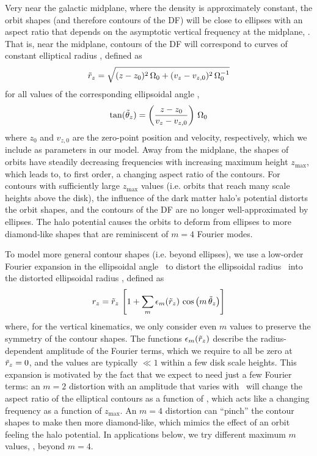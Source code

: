 Very near the galactic midplane, where the density is approximately constant, the orbit
shapes (and therefore contours of the DF) will be close to ellipses with an aspect ratio
that depends on the asymptotic vertical frequency at the midplane, \freqzero.
That is, near the midplane, contours of the DF will correspond to curves of constant
elliptical radius \rzp, defined as
\begin{equation}
    \tilde{r}_z = \sqrt{(z-z_0)^2 \, \Omega_0 + (v_z-v_{z,0})^2 \, \Omega_0^{-1}} \label{eq:rzp}
\end{equation}
for all values of the corresponding ellipsoidal angle \thzp,
\begin{equation}
    \tan (\tilde{\theta}_z) = \left(\frac{z-z_0}{v_z-v_{z,0}}\right) \, \Omega_0
    \label{eq:thetazp}
\end{equation}
where $z_0$ and $v_{z,0}$ are the zero-point position and velocity, respectively, which
we include as parameters in our model.
Away from the midplane, the shapes of orbits have steadily decreasing frequencies with
increasing maximum height $z_{\textrm{max}}$, which leads to, to first order, a changing
aspect ratio of the contours.
For contours with sufficiently large $z_{\textrm{max}}$ values (i.e. orbits that reach
many scale heights above the disk), the influence of the dark matter halo's potential
distorts the orbit shapes, and the contours of the DF are no longer well-approximated by
ellipses.
The halo potential causes the orbits to deform from ellipses to more diamond-like shapes
that are reminiscent of $m=4$ Fourier modes.

To model more general contour shapes (i.e. beyond ellipses), we use a low-order Fourier
expansion in the ellipsoidal angle \thzp\ to distort the ellipsoidal radius \rzp\
into the distorted ellipsoidal radius \rz, defined as
\begin{equation}
    r_z = \tilde{r}_z \, \left[1 + \sum_m \epsilon_m(\tilde{r}_z) \, \cos{\left(m\,\ensuremath{\tilde{\theta}_z}\right)}\right] \label{eq:rz}
\end{equation}
where, for the vertical kinematics, we only consider even $m$ values to preserve the
symmetry of the contour shapes.
The functions $\epsilon_m(\tilde{r}_z)$ describe the radius-dependent amplitude of the Fourier
terms, which we require to all be zero at $\tilde{r}_z=0$, and the values are typically $\ll
1$ within a few disk scale heights.
This expansion is motivated by the fact that we expect to need just a few Fourier terms:
an $m=2$ distortion with an amplitude that varies with \rzp\ will change the aspect
ratio of the elliptical contours as a function of \rzp, which acts like a changing
frequency as a function of $z_{\textrm{max}}$.
An $m=4$ distortion can ``pinch'' the contour shapes to make then more diamond-like,
which mimics the effect of an orbit feeling the halo potential.
In applications below, we try different maximum $m$ values, \mmax, beyond
$m=4$.

